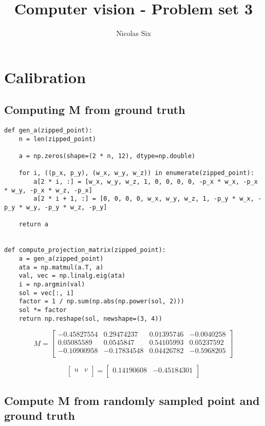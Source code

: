 \documentclass[a4paper,11pt]{article}
\title{Computer vision - Problem set 3}
\author{Nicolas Six}
\begin{document}
\maketitle

\section{Calibration}
\subsection{Computing M from ground truth}

\begin{lstlisting}
def gen_a(zipped_point):
    n = len(zipped_point)

    a = np.zeros(shape=(2 * n, 12), dtype=np.double)

    for i, ((p_x, p_y), (w_x, w_y, w_z)) in enumerate(zipped_point):
        a[2 * i, :] = [w_x, w_y, w_z, 1, 0, 0, 0, 0, -p_x * w_x, -p_x * w_y, -p_x * w_z, -p_x]
        a[2 * i + 1, :] = [0, 0, 0, 0, w_x, w_y, w_z, 1, -p_y * w_x, -p_y * w_y, -p_y * w_z, -p_y]

    return a


def compute_projection_matrix(zipped_point):
    a = gen_a(zipped_point)
    ata = np.matmul(a.T, a)
    val, vec = np.linalg.eig(ata)
    i = np.argmin(val)
    sol = vec[:, i]
    factor = 1 / np.sum(np.abs(np.power(sol, 2)))
    sol *= factor
    return np.reshape(sol, newshape=(3, 4))
\end{lstlisting}

\[
M=
\begin{bmatrix}
  -0.45827554 & 0.29474237 & 0.01395746 & -0.0040258\\
  0.05085589 & 0.0545847 & 0.54105993 & 0.05237592\\
  -0.10900958 & -0.17834548 & 0.04426782 & -0.5968205\\
\end{bmatrix}
\]

\[
\begin{bmatrix}
  u & v \\
\end{bmatrix}
 = 
\begin{bmatrix}
  0.14190608 & -0.45184301 \\
\end{bmatrix}
\]

\subsection{Compute M from randomly sampled point and ground truth}
\end{document}

